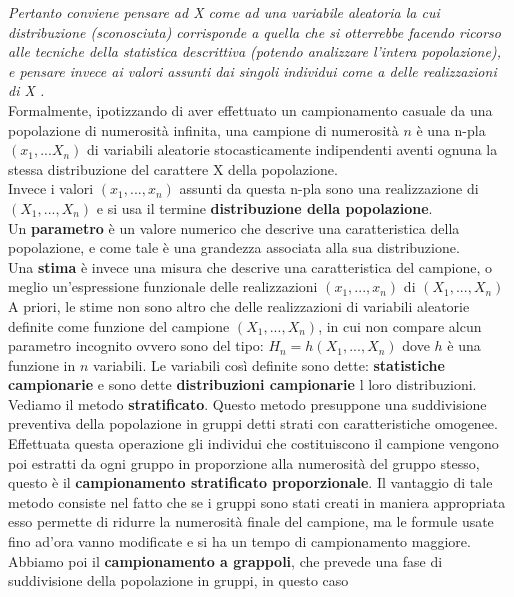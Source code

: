 \documentclass[a4paper,12pt, oneside]{book}
\begin{document}
\textit{Pertanto conviene pensare ad X come ad una variabile aleatoria la cui distribuzione
(sconosciuta) corrisponde a quella che si otterrebbe facendo ricorso alle tecniche
della statistica descrittiva (potendo analizzare l’intera popolazione), e pensare invece
ai valori assunti dai singoli individui come a delle realizzazioni di X .
}\\
Formalmente, ipotizzando di aver effettuato un campionamento casuale da una
popolazione di numerosità infinita, una campione di numerosità $n$ è una n-pla $(x_1,...X_n)$ di variabili aleatorie stocasticamente indipendenti
aventi ognuna la stessa distribuzione del carattere X della popolazione.\\
Invece i valori $(x_1,...,x_n)$ assunti da questa n-pla sono una realizzazione di $(X_1,...,X_n)$ e si usa il termine \textbf{distribuzione della popolazione}.\\
Un \textbf{parametro} è un valore numerico che descrive una caratteristica della
popolazione, e come tale è una grandezza associata alla sua distribuzione.\\
Una \textbf{stima} è invece una misura che descrive una caratteristica del campione, o
meglio un’espressione funzionale delle realizzazioni $(x_1,...,x_n)$ di $(X_1,...,X_n)$\\
A priori, le stime non sono altro che delle realizzazioni di variabili
aleatorie definite come funzione del campione $(X_1,...,X_n)$, in cui non compare alcun parametro incognito ovvero sono del tipo: $H_n=h(X_1,...,X_n)$
dove $h$ è una funzione in $n$ variabili. Le variabili così definite sono dette:
\textbf{statistiche campionarie} e sono dette \textbf{distribuzioni campionarie} l loro distribuzioni.\\
Vediamo il metodo \textbf{stratificato}. Questo metodo presuppone una suddivisione preventiva della popolazione in gruppi detti strati
con caratteristiche omogenee. Effettuata questa operazione gli individui che costituiscono il campione vengono poi
estratti da ogni gruppo in proporzione alla numerosità del gruppo stesso, questo è il
\textbf{campionamento stratificato proporzionale}. Il vantaggio di tale metodo consiste nel fatto che se i gruppi sono stati creati in
maniera appropriata esso permette di ridurre la numerosità finale del campione, ma le formule usate fino ad'ora vanno modificate e si ha un tempo di campionamento maggiore.\\
Abbiamo poi il \textbf{campionamento a grappoli}, che prevede una fase di suddivisione della popolazione in gruppi, in questo caso
\end{document}
